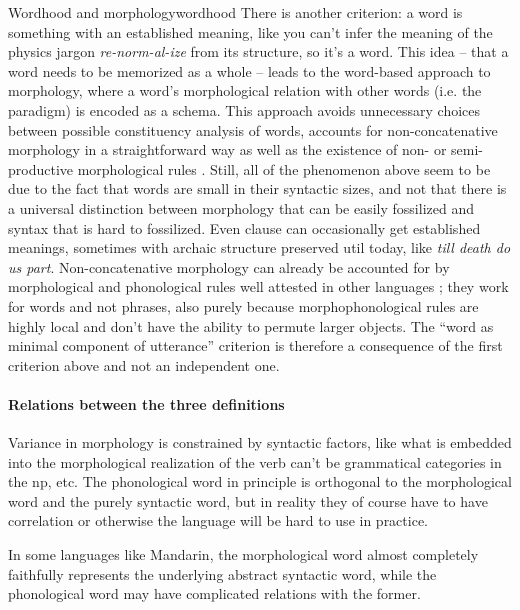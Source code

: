 \documentclass[a4paper, oneside]{report}
\newcommand*{\citechap}[1]{chap.~{#1}}
\newcommand{\form}[1]{\emph{#1}}
\begin{document}
\begin{theorybox}{Wordhood and morphology}{wordhood}
    There is another criterion: 
    a word is something with an established meaning,
    like you can't infer the meaning of the physics jargon \form{re-norm-al-ize} 
    from its structure, so it's a word.
    This idea -- that a word needs to be memorized as a whole -- 
    leads to the word-based approach to morphology,
    where a word's morphological relation with other words (i.e. the paradigm)
    is encoded as a schema.
    This approach avoids unnecessary choices between possible constituency analysis of words,
    accounts for non-concatenative morphology in a straightforward way
    as well as the existence of non- or semi-productive morphological rules
    \citep[\citechap{3, 4}]{haspelmath2013understanding}.
    Still, all of the phenomenon above
    seem to be due to the fact that 
    words are small in their syntactic sizes, 
    and not that there is a universal distinction 
    between morphology that can be easily fossilized 
    and syntax that is hard to fossilized.
    Even clause can occasionally get established meanings,
    sometimes with archaic structure preserved util today,
    like \form{till death do us part}.
    Non-concatenative morphology can already be accounted for 
    by morphological and phonological rules well attested in other languages 
    \citep{tucker2011morphosyntax};
    they work for words and not phrases, 
    also purely because morphophonological rules are highly local 
    and don't have the ability to permute larger objects.
    The ``word as minimal component of utterance'' 
    criterion is therefore a consequence of the first criterion above 
    and not an independent one.
    
    \paragraph*{Relations between the three definitions} 
    Variance in morphology is constrained by syntactic factors,
    like what is embedded into the morphological realization of the verb 
    can't be grammatical categories in the \acs{np}, etc.
    The phonological word in principle is orthogonal to 
    the morphological word and the purely syntactic word,
    but in reality they of course have to have correlation
    or otherwise the language will be hard to use in practice.
    
    In some languages like Mandarin, 
    the morphological word almost completely faithfully represents 
    the underlying abstract syntactic word, 
    while the phonological word may have complicated relations with the former.


\end{theorybox}
\end{document}
